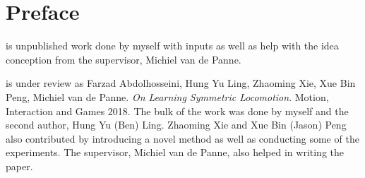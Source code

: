 
\chapter{Preface}

 is unpublished work done by myself with inputs as well as help with the idea conception from the supervisor, Michiel van de Panne.

 is under review as Farzad Abdolhosseini, Hung Yu Ling, Zhaoming Xie, Xue Bin Peng, Michiel van de Panne. \textit{On Learning Symmetric Locomotion}. Motion, Interaction and Games 2018. The bulk of the work was done by myself and the second author, Hung Yu (Ben) Ling. Zhaoming Xie and Xue Bin (Jason) Peng also contributed by introducing a novel method as well as conducting some of the experiments. The supervisor, Michiel van de Panne, also helped in writing the paper.
